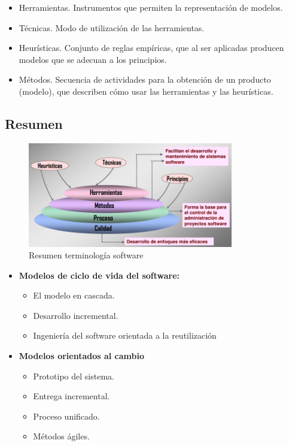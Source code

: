 \documentclass{article}
\begin{document}
\begin{itemize}
\item Herramientas. Instrumentos que permiten la representación de modelos.

\item Técnicas. Modo de utilización de las herramientas.

\item Heurísticas. Conjunto de reglas empíricas, que al ser aplicadas producen modelos que se adecuan a los principios.

\item Métodos. Secuencia de actividades para la obtención de un producto (modelo), que describen cómo usar las herramientas y las heurísticas.
\end{itemize}

\subsection{Resumen}
\begin{figure}[h]
\centering
\caption{Resumen terminología software}
\includegraphics[scale=1,width=0.8\textwidth]{resumen.png}
\end{figure}

\begin{itemize}
\item \textbf{Modelos de ciclo de vida del software:}

	\begin{itemize}
	\item El modelo en cascada.
	\item Desarrollo incremental.
	\item Ingeniería del software orientada a la reutilización
	\end{itemize}
	
\item \textbf{Modelos orientados al cambio}
	
	\begin{itemize}
	\item Prototipo del sistema.
	\item Entrega incremental.
	\item Proceso unificado.
	\item Métodos ágiles.
	\end{itemize}
\end{itemize}
\end{document}
